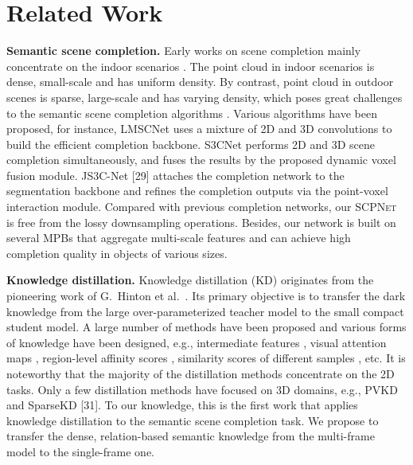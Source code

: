 \documentclass[10pt,twocolumn,letterpaper]{article}
\newcommand{\methodname}{\textsc{SCPNet}}
\begin{document}

\section{Related Work}

\textbf{Semantic scene completion.}
Early works on scene completion mainly concentrate on the indoor scenarios \cite{maximberman2018,yanchengpan2018,martingarbade,fredtungandgregmori}. The point cloud in indoor scenarios is dense, small-scale and has uniform density. By contrast, point cloud in outdoor scenes is sparse, large-scale and has varying density, which poses great challenges to the semantic scene completion algorithms \cite{diederikpkingma2015,haotiantang2020,yuenanhou2022}. Various algorithms have been proposed, for instance, LMSCNet \cite{yuenanhou2017} uses a mixture of 2D and 3D convolutions to build the efficient completion backbone. S3CNet \cite{diederikpkingma2015} performs 2D and 3D scene completion simultaneously, and fuses the results by the proposed dynamic voxel fusion module. JS3C-Net [29] attaches the completion network to the segmentation backbone and refines the completion outputs via the point-voxel interaction module. Compared with previous completion networks, our \methodname{} is free from the lossy downsampling operations. Besides, our network is built on several MPBs that aggregate multi-scale features and can achieve high completion quality in objects of various sizes.

\textbf{Knowledge distillation.}
Knowledge distillation (KD) originates from the pioneering work of G.\ Hinton et al.\ \cite{nikolaospassalisandanastasiostefas2021}. Its primary objective is to transfer the dark knowledge from the large over-parameterized teacher model to the small compact student model. A large number of methods have been proposed and various forms of knowledge \cite{yuenanhou2020,joeywilson2019,ref0} have been designed, e.g., intermediate features \cite{angeladai2021,yuenanhou2020}, visual attention maps \cite{christophbrist2021}, region-level affinity scores \cite{rancheng2018}, similarity scores of different samples \cite{joeywilson2019,xiaohanxing2022}, etc. It is noteworthy that the majority of the distillation methods concentrate on the 2D tasks. Only a few distillation methods have focused on 3D domains, e.g., PVKD \cite{luisroldao2018} and SparseKD [31]. To our knowledge, this is the first work that applies knowledge distillation to the semantic scene completion task. We propose to transfer the dense, relation-based semantic knowledge from the multi-frame model to the single-frame one.
\end{document}
